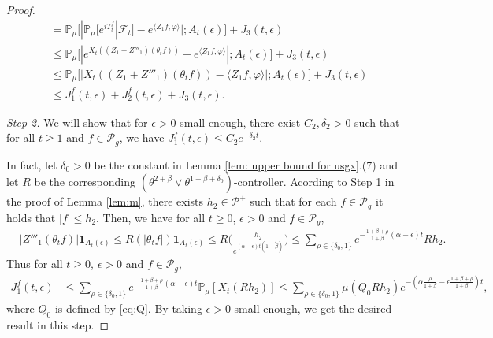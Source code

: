 \documentclass[EJP]{ejpecp} %
\begin{document}
\begin{proof}
\begin{align}
  & = \mathbb{P}_{\mu}\Big[ |\mathbb{P}_\mu [e^{i\Upsilon^f_t}| \mathscr F_{t}]-e^{\langle Z_1f, \varphi\rangle}| ; A_{t}(\epsilon) \Big] + J_3(t,\epsilon) \\
  & \leq \mathbb{P}_\mu \Big[ |e^{X_{t}((Z_1+Z'''_1) (\theta_t f))}-e^{\langle Z_1f, \varphi\rangle} | ; A_{t}(\epsilon) \Big]+  J_3(t,\epsilon) \\
  & \leq \mathbb{P}_\mu \Big[ | X_{t} ( (Z_1+Z'''_1)(\theta_t f)) - \langle Z_1f, \varphi\rangle | ;A_{t}(\epsilon)\Big]+  J_3(t,\epsilon) \\
  & \leq J^f_1(t,\epsilon) + J^f_2(t,\epsilon)+ J_3(t,\epsilon).
\end{align}

\emph{Step 2.} We will show that for $\epsilon>0$ small enough, there exist  $C_2, \delta_2>0$ such that for all $t\geq 1$ and
$f \in \mathcal P_g$, we have $ J^f_1(t,\epsilon) \leq C_2e^{-\delta_2 t}$.

In fact, let $\delta_0 >0$ be the constant in Lemma \ref{lem: upper bound for usgx}.(7) and let $R$ be the corresponding $(\theta^{2+\beta}\vee \theta^{1+\beta+\delta_0})$-controller.
Acording to Step 1 in the proof of Lemma \ref{lem:m}, there exists $h_{2} \in \mathcal P^+$ such that for each $f \in \mathcal P_g$ it holds that $|f| \leq h_{2}$.
Then, we have for all $t\geq 0$, $\epsilon> 0$ and $f\in \mathcal P_g$,
\begin{align}
  & |Z'''_1(\theta_t f)|\mathbf{1}_{A_{t}(\epsilon)}
    \leq R(|\theta_{t} f|)\mathbf{1}_{A_{t}(\epsilon)}
    \leq R \Big(\frac{h_{2}}{e^{(\alpha-\epsilon)t(1-\tilde \beta)}}\Big)
    \leq \sum_{\rho \in \{\delta_0,1\}}e^{-\frac{1+\beta+\rho}{1+\beta}(\alpha-\epsilon)t}Rh_{2}.
\end{align}
Thus for all $t\geq 0$, $\epsilon> 0$ and $f\in \mathcal P_g$,
\begin{align}
  \label{eq: estimate of J1}
  J^f_1(t,\epsilon)
& \leq \sum_{\rho \in \{\delta_0,1\}}e^{-\frac{1+\beta+\rho}{1+\beta}(\alpha-\epsilon)t}\mathbb{P}_{\mu}[X_{t}(Rh_2)]
  \leq \sum_{\rho \in \{\delta_0,1\}} \mu(Q_0 R h_{2}) e^{-(\alpha\frac{\rho}{1+\beta}-\epsilon\frac{1+\beta+\rho}{1+\beta})t},
\end{align}
where $Q_0$ is defined by \eqref{eq:Q}.
By taking $\epsilon>0$ small enough, we get the desired result in this step.


\end{proof}
\end{document}
